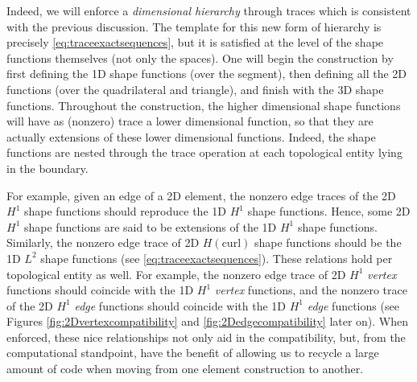 Indeed, we will enforce a \textit{dimensional hierarchy} through traces which is consistent with the previous discussion.
The template for this new form of hierarchy is precisely \eqref{eq:traceexactsequences}, but it is satisfied at the level of the shape functions themselves (not only the spaces).
One will begin the construction by first defining the 1D shape functions (over the segment), then defining all the 2D functions (over the quadrilateral and triangle), and finish with the 3D shape functions.
Throughout the construction, the higher dimensional shape functions will have as (nonzero) trace a lower dimensional function,
so that they are actually extensions of these lower dimensional functions.
Indeed, the shape functions are nested through the trace operation at each topological entity lying in the boundary.

For example, given an edge of a 2D element, the nonzero edge traces of the 2D $H^1$ shape functions should reproduce the 1D $H^1$ shape functions.
Hence, some 2D $H^1$ shape functions are said to be extensions of the 1D $H^1$ shape functions.
Similarly, the nonzero edge trace of 2D $H(\mathrm{curl})$ shape functions should be the 1D $L^2$ shape functions (see \eqref{eq:traceexactsequences}).
These relations hold per topological entity as well.
For example, the nonzero edge trace of 2D $H^1$ \textit{vertex} functions should coincide with the 1D $H^1$ \textit{vertex} functions, and the nonzero trace of the 2D $H^1$ \textit{edge} functions should coincide with the 1D $H^1$ \textit{edge} functions (see Figures \ref{fig:2Dvertexcompatibility} and \ref{fig:2Dedgecompatibility} later on).
When enforced, these nice relationships not only aid in the compatibility, but, from the computational standpoint, have the benefit of allowing us to recycle a large amount of code when moving from one element construction to another.

